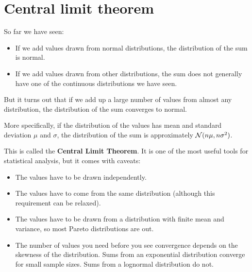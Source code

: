 \documentclass[12pt]{book}
\begin{document}
\section{Central limit theorem}
\label{CLT}

So far we have seen:

\begin{itemize}

\item If we add values drawn from normal distributions, the distribution
of the sum is normal.

\item If we add values drawn from other distributions, the sum does not
generally have one of the continuous distributions we have seen.

\end{itemize}

But it turns out that if we add up a large number of values from
almost any distribution, the distribution of the sum converges to
normal.

More specifically, if the distribution of the values has mean and
standard deviation $\mu$ and $\sigma$, the distribution of the sum is
approximately $\mathcal{N}(n \mu, n \sigma^2)$.

This is called the {\bf Central Limit Theorem}.  It is one of the
most useful tools for statistical analysis, but it comes with
caveats:

\begin{itemize}

\item The values have to be drawn independently.

\item The values have to come from the same distribution (although
  this requirement can be relaxed).

\item The values have to be drawn
  from a distribution with finite mean and variance, so most Pareto
  distributions are out.

\item The number of values you need before you see convergence depends
  on the skewness of the distribution.  Sums from an exponential
  distribution converge for small sample sizes.  Sums from a
  lognormal distribution do not.

\end{itemize}
\end{document}
